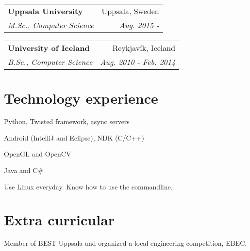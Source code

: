 \documentclass[letterpaper]{article}
\makeatletter
\newcommand{\ressubheading}[4]{
\begin{tabular*}{6.5in}{l@{\extracolsep{\fill}}r}
    \textbf{#1} & #2 \\
    \textit{#3} & \textit{#4} \\
\end{tabular*}\vspace{-6pt}}
\renewenvironment{itemize}{
  \begin{list}{}{
    \setlength{\leftmargin}{1.5em}
  }
}{
  \end{list}
}
\makeatother
\begin{document}
\begin{itemize}
\item
  \ressubheading{Uppsala University}{Uppsala, Sweden}{M.Sc., Computer Science}{Aug. 2015 - }

\item
  \ressubheading{University of Iceland}{Reykjavík, Iceland}{B.Sc., Computer Science}{Aug. 2010 - Feb. 2014}

\end{itemize}

\section*{Technology experience}

\begin{itemize}
\item Python, Twisted framework, async servers
\item Android (IntelliJ and Eclipse), NDK (C/C++)
\item OpenGL and OpenCV
\item Java and C\#
\item Use Linux everyday. Know how to use the commandline.

\end{itemize}


\section*{Extra curricular}

\begin{itemize}
\item Member of BEST Uppsala and organized a local engineering competition, EBEC.
\item
\end{itemize}
\end{document}
